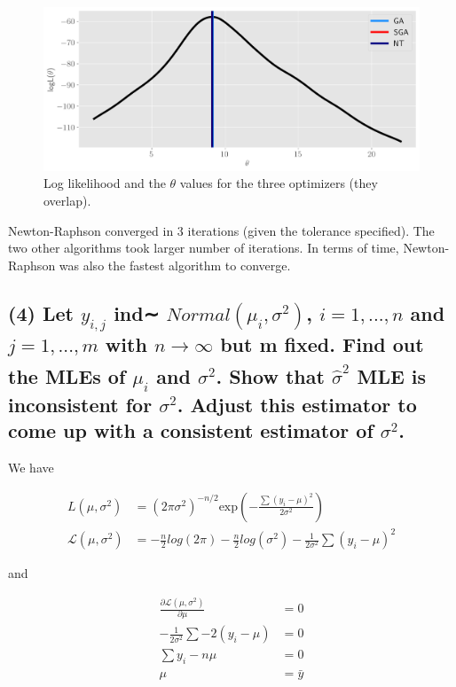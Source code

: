\documentclass[11pt]{article}
\begin{document}
\begin{figure}[!h]
    \centering
    \includegraphics[scale=.55]{homework_2/figures/cauchy_loglike.png}
    \caption{Log likelihood and the $\theta$ values for the three optimizers (they overlap).}
    \label{fig:my_label}
\end{figure}

Newton-Raphson converged in 3 iterations (given the tolerance specified). The two other algorithms took larger number of iterations. In terms of time, Newton-Raphson was also the fastest algorithm to converge.

\subsection*{(4) Let $y_{i,j}$
ind∼ $Normal(\mu_i,\sigma^2)$, $i = 1,...,n$ and $j = 1,...,m$ with $n \xrightarrow[]{} \infty$
but m fixed. Find out the MLEs of $\mu_i$ and $\sigma^2$. Show that  $\hat{\sigma}^2$ MLE is inconsistent for $\sigma^2$. Adjust this estimator to come up with a consistent estimator of  $\sigma^2$.}

We have

\begin{align*}
    L(\mu, \sigma^2) &=  (2\pi \sigma^2)^{-n/2} \text{exp} \left(- \frac{\sum(y_i-\mu)^2}{2\sigma^2}\right)\\
    \mathcal{L}(\mu, \sigma^2) &= -\frac{n}{2}log(2\pi)  -\frac{n}{2}log(\sigma^2)  -\frac{1}{2\sigma^2}\sum(y_i-\mu)^2
\end{align*}

and 

\begin{align*}
    \frac{\partial \mathcal{L}(\mu, \sigma^2)}{\partial \mu} &= 0 \\
    -\frac{1}{2\sigma^2} \sum -2(y_i-\mu)&= 0 \\
     \sum y_i-n\mu&= 0 \\
     \mu&= \bar{y} \\
\end{align*}
\end{document}
